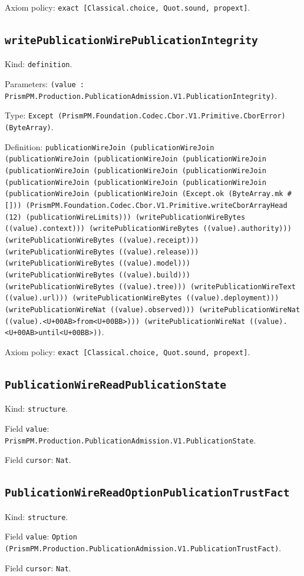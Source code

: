 \documentclass[11pt]{article}
\begin{document}
\noindent Axiom policy: \texttt{exact [Classical.choice, Quot.sound, propext]}.\par
\subsection*{\texttt{writePublicationWirePublicationIntegrity}}
\noindent Kind: \texttt{definition}.\par
\noindent Parameters: \texttt{(value : PrismPM.Production.PublicationAdmission.V1.PublicationIntegrity)}.\par
\noindent Type: \texttt{Except (PrismPM.Foundation.Codec.Cbor.V1.Primitive.CborError) (ByteArray)}.\par
\noindent Definition: \texttt{publicationWireJoin (publicationWireJoin (publicationWireJoin (publicationWireJoin (publicationWireJoin (publicationWireJoin (publicationWireJoin (publicationWireJoin (publicationWireJoin (publicationWireJoin (publicationWireJoin (publicationWireJoin (publicationWireJoin (Except.ok (ByteArray.mk \#[])) (PrismPM.Foundation.Codec.Cbor.V1.Primitive.writeCborArrayHead (12) (publicationWireLimits))) (writePublicationWireBytes ((value).context))) (writePublicationWireBytes ((value).authority))) (writePublicationWireBytes ((value).receipt))) (writePublicationWireBytes ((value).release))) (writePublicationWireBytes ((value).model))) (writePublicationWireBytes ((value).build))) (writePublicationWireBytes ((value).tree))) (writePublicationWireText ((value).url))) (writePublicationWireBytes ((value).deployment))) (writePublicationWireNat ((value).observed))) (writePublicationWireNat ((value).<U+00AB>from<U+00BB>))) (writePublicationWireNat ((value).<U+00AB>until<U+00BB>))}.\par
\noindent Axiom policy: \texttt{exact [Classical.choice, Quot.sound, propext]}.\par
\subsection*{\texttt{PublicationWireReadPublicationState}}
\noindent Kind: \texttt{structure}.\par
\noindent Field \texttt{value}: \texttt{PrismPM.Production.PublicationAdmission.V1.PublicationState}.\par
\noindent Field \texttt{cursor}: \texttt{Nat}.\par
\subsection*{\texttt{PublicationWireReadOptionPublicationTrustFact}}
\noindent Kind: \texttt{structure}.\par
\noindent Field \texttt{value}: \texttt{Option (PrismPM.Production.PublicationAdmission.V1.PublicationTrustFact)}.\par
\noindent Field \texttt{cursor}: \texttt{Nat}.\par
\end{document}
